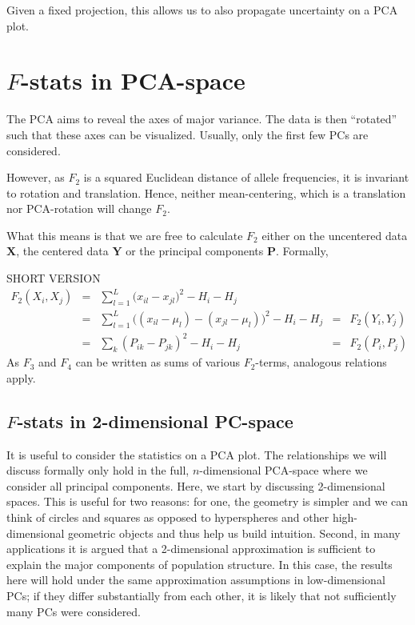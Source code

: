 \documentclass[10pt,a4paper]{article}
\newcommand{\MX}{\mathbf{X}} %
\newcommand{\MY}{\mathbf{Y}} %
\newcommand{\MP}{\mathbf{P}} %
\begin{document}
Given a fixed projection, this allows us to also propagate uncertainty on a PCA plot.

\section{$F$-stats in PCA-space}
The PCA aims to reveal the axes of major variance. The data is then ``rotated'' such that these axes can be visualized. Usually, only the first few PCs are considered. 

However, as $F_2$ is a squared Euclidean distance of allele frequencies, it is invariant to rotation and translation. Hence, neither mean-centering, which is a translation nor PCA-rotation will change $F_2$.

What this means is that we are free to calculate $F_2$ either on the uncentered data $\MX$, the centered data $\MY$ or the principal components $\MP$. Formally,



SHORT VERSION
\begin{align}
F_2(X_i, X_j) &=&  \sum_{l=1}^L \big( x_{il} -x_{jl}\big)^2 - H_i - H_j &&\nonumber\\ 
 &=& \sum_{l=1}^L \big( (x_{il} - \mu_l) -(x_{jl} -\mu_l)\big)^2 - H_i - H_j  &=& F_2(Y_i, Y_j) \nonumber\\
 &=& \sum_k (P_{ik} - P_{jk})^2 - H_i - H_j &=& F_2(P_i, P_j)
\end{align}
As $F_3$ and $F_4$ can be written as sums of various $F_2$-terms, analogous relations apply.

\subsection{$F$-stats in 2-dimensional PC-space}
 It is useful to consider the statistics on a PCA plot. The relationships we will discuss formally only hold in the full, $n$-dimensional PCA-space where we consider all principal components. Here, we start by discussing 2-dimensional spaces. This is useful for two reasons: for one, the geometry is simpler and we can think of circles and squares as opposed to hyperspheres and other high-dimensional geometric objects and thus help us build intuition. Second, in many applications it is argued that a 2-dimensional approximation is sufficient to explain the major components of population structure. In this case, the results here will hold under the same approximation assumptions in low-dimensional PCs; if they differ substantially from each other, it is likely that not sufficiently many PCs were considered.
\end{document}
